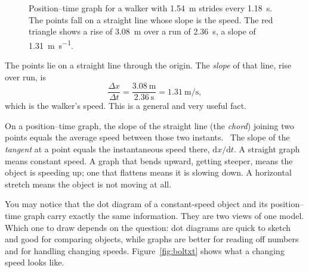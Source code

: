 \documentclass[11pt,twoside,openany]{book}
\newcommand{\dd}{\mathrm{d}}
\newcommand{\viewtag}[3]{\fcolorbox{#2}{#3}{\footnotesize\textbf{\textcolor{#2}{#1}}}}
\newcommand{\calctag}{\viewtag{Calculus}{calccol}{calcpale}}
\begin{document}
\begin{figure}[htb]
\centering
{}
\caption{Position--time graph for a walker with \SI{1.54}{\metre} strides every \SI{1.18}{\second}. The points fall on a straight line whose slope is the speed. The red triangle shows a rise of \SI{3.08}{\metre} over a run of \SI{2.36}{\second}, a slope of \SI{1.31}{\metre\per\second}.}
\label{fig:xt}
\end{figure}

The points lie on a straight line through the origin. The \emph{slope} of that line, rise over run, is
\[
\frac{\Delta x}{\Delta t} = \frac{\SI{3.08}{\metre}}{\SI{2.36}{\second}} = \SI{1.31}{\metre\per\second},
\]
which is the walker's speed. This is a general and very useful fact.

\begin{keyidea}
On a position--time graph, the slope of the straight line (the \emph{chord}) joining two points equals the average speed between those two instants. \calctag\ The slope of the \emph{tangent} at a point equals the instantaneous speed there, $\dd x/\dd t$. A straight graph means constant speed. A graph that bends upward, getting steeper, means the object is speeding up; one that flattens means it is slowing down. A horizontal stretch means the object is not moving at all.
\end{keyidea}

You may notice that the dot diagram of a constant-speed object and its position--time graph carry exactly the same information. They are two views of one model. Which one to draw depends on the question: dot diagrams are quick to sketch and good for comparing objects, while graphs are better for reading off numbers and for handling changing speeds. Figure~\ref{fig:boltxt} shows what a changing speed looks like.
\end{document}

